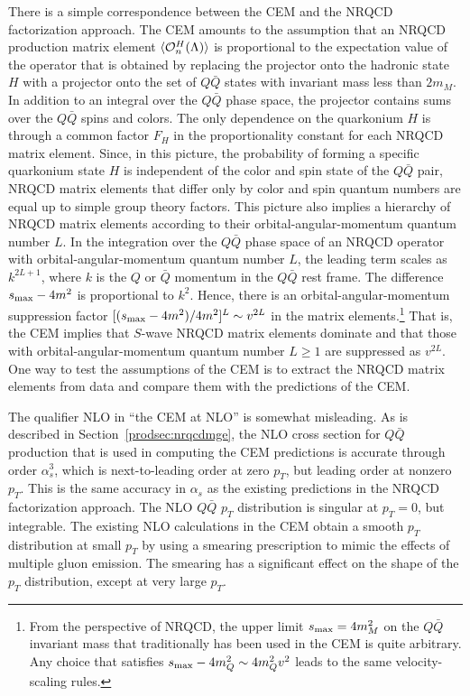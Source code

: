 There is a simple correspondence between
the CEM and the NRQCD factorization approach. The CEM amounts to the
assumption that an NRQCD production matrix element 
$\langle {\cal O}_n^H(\Lambda) \rangle$
is proportional to the expectation value of
the operator that is obtained by replacing the projector onto the
hadronic state $H$ with a projector onto the set of $Q\bar Q$ states
with invariant mass less
than $2m_M$. In addition to an integral over the $Q\bar Q$ phase space,
the projector contains sums over the $Q\bar Q$ spins and colors.
The only dependence on
the quarkonium $H$ is through a common factor $F_H$ in the
proportionality constant for each NRQCD matrix element. Since, in this
picture, the probability of forming a specific quarkonium state $H$ is
independent of the color and spin state of the $Q \bar Q$ pair, NRQCD
matrix elements that differ only  by color and spin quantum numbers are
equal up to simple group theory factors. This picture also implies a
hierarchy of NRQCD matrix elements according to their
orbital-angular-momentum quantum number $L$. In the integration over the
$Q\bar Q$ phase space of an NRQCD operator with orbital-angular-momentum
quantum number $L$, the leading term scales as $k^{2L+1}$, where $k$ is
the $Q$ or $\bar Q$ momentum in the $Q\bar Q$ rest frame. The difference
$s_{\rm max}- 4 m^2$ is proportional to $k^2$. Hence, there is an
orbital-angular-momentum suppression factor $[(s_{\rm max}- 4 m^2)/4
m^2]^L \sim v^{2L}$ in the matrix elements.\footnote{From the
perspective of NRQCD, the upper limit $s_{\rm max} = 4m_M^2$ on the $Q
\bar Q$ invariant mass that traditionally has been used in the CEM is
quite arbitrary.  Any choice that satisfies $s_{\rm max}- 4m_Q^2 \sim 4
m_Q^2 v^2$ leads to the same velocity-scaling rules.} That is, the CEM
implies that $S$-wave NRQCD matrix elements dominate and that those with
orbital-angular-momentum quantum number $L\ge 1$ are suppressed as
$v^{2L}$. One way to test the assumptions of the CEM is to extract the
NRQCD matrix elements from data and compare them with the predictions of
the CEM. 

The qualifier NLO in ``the CEM at NLO'' is somewhat misleading. As is
described in Section~\ref{prodsec:nrqcdmge}, the NLO cross section for
$Q \bar Q$ production that is used in computing the CEM predictions is
accurate through order $\alpha_s^3$, which is next-to-leading order at
zero $p_T$, but leading order at nonzero $p_T$. This is the same
accuracy in $\alpha_s$ as the existing predictions in the NRQCD
factorization approach. The NLO $Q\bar Q$ $p_T$ distribution is singular
at $p_T=0$, but integrable.  The existing NLO calculations in the CEM
obtain a smooth $p_T$ distribution at small $p_T$ by using a smearing
prescription to mimic the effects of multiple gluon emission. The
smearing has a significant effect on the shape of the $p_T$
distribution, except at very large $p_T$.





